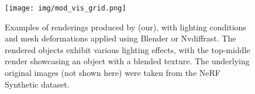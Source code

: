 \begin{figure}
    \centering
        \texttt{[image: img/mod\_vis\_grid.png]}
    \caption{Examples of renderings produced by \our{} (our), with lighting conditions and mesh deformations applied using Blender or Nvdiffrast. The rendered objects exhibit various lighting effects, with the top-middle render showcasing an object with a blended texture.
    The underlying original images (not shown here) were taken from the NeRF Synthetic dataset.  %
    }
    \label{fig:example}
\end{figure}